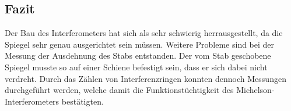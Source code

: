 \subsection{Fazit}


Der Bau des Interferometers hat sich als sehr schwierig herrausgestellt, da die Spiegel sehr genau ausgerichtet sein müssen.
Weitere Probleme sind bei der Messung der Ausdehnung des Stabs entstanden. Der vom Stab geschobene Spiegel musste so auf einer Schiene befestigt sein, dass er sich dabei nicht verdreht.
Durch das Zählen von Interferenzringen konnten dennoch Messungen durchgeführt werden, welche damit die Funktionstüchtigkeit des Michelson-Interferometers bestätigten.


